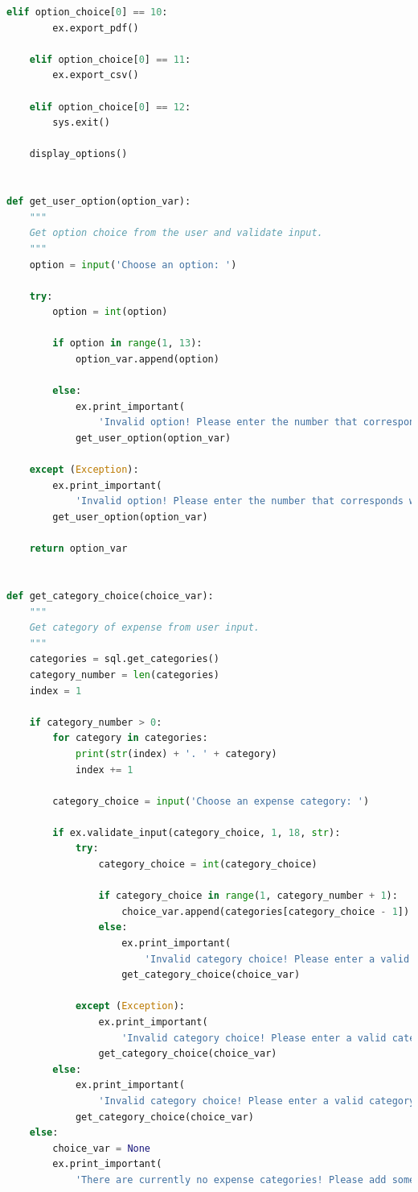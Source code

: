 \documentclass[11pt]{article}
\begin{document}
\begin{lstlisting}[language=Python, caption=Source code for \textit{expcli.py}.]
    elif option_choice[0] == 10:
        ex.export_pdf()

    elif option_choice[0] == 11:
        ex.export_csv()

    elif option_choice[0] == 12:
        sys.exit()

    display_options()


def get_user_option(option_var):
    """
    Get option choice from the user and validate input.
    """
    option = input('Choose an option: ')

    try:
        option = int(option)

        if option in range(1, 13):
            option_var.append(option)

        else:
            ex.print_important(
                'Invalid option! Please enter the number that corresponds with the desired option from the list.')
            get_user_option(option_var)

    except (Exception):
        ex.print_important(
            'Invalid option! Please enter the number that corresponds with the desired option from the list.')
        get_user_option(option_var)

    return option_var


def get_category_choice(choice_var):
    """
    Get category of expense from user input.
    """
    categories = sql.get_categories()
    category_number = len(categories)
    index = 1

    if category_number > 0:
        for category in categories:
            print(str(index) + '. ' + category)
            index += 1

        category_choice = input('Choose an expense category: ')

        if ex.validate_input(category_choice, 1, 18, str):
            try:
                category_choice = int(category_choice)

                if category_choice in range(1, category_number + 1):
                    choice_var.append(categories[category_choice - 1])
                else:
                    ex.print_important(
                        'Invalid category choice! Please enter a valid category!')
                    get_category_choice(choice_var)

            except (Exception):
                ex.print_important(
                    'Invalid category choice! Please enter a valid category!')
                get_category_choice(choice_var)
        else:
            ex.print_important(
                'Invalid category choice! Please enter a valid category!')
            get_category_choice(choice_var)
    else:
        choice_var = None
        ex.print_important(
            'There are currently no expense categories! Please add some before adding your first expenses.')


\end{lstlisting}
\end{document}
